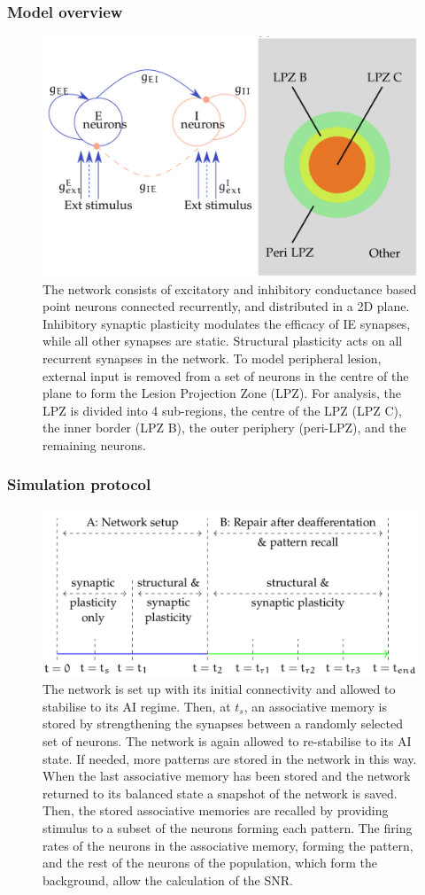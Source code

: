 \begin{frame}[c]
  \frametitle{Model overview}
  \begin{figure}[h]
    \centering
    \includegraphics[width=0.6\linewidth]{99_images/schematic}
    \caption{The network consists of excitatory and inhibitory conductance based point neurons connected recurrently, and distributed in a 2D plane. Inhibitory synaptic plasticity\footnotemark[2]{} modulates the efficacy of IE synapses, while all other synapses are static. Structural plasticity\footnotemark[3]{} acts on all recurrent synapses in the network. To model  peripheral lesion, external input is removed from a set of neurons in the centre of the plane to form the Lesion Projection Zone (LPZ). For analysis, the LPZ is divided into 4 sub-regions, the centre of the LPZ (LPZ C), the inner border (LPZ B), the outer periphery (peri-LPZ), and the remaining neurons.}
  \end{figure}%
\end{frame}
\begin{frame}[c]
  \frametitle{Simulation protocol}
  \begin{figure}[h]
    \centering
    \includegraphics[width=0.8\linewidth]{99_images/recall-protocol}
    \caption{The network is set up with its initial connectivity and allowed to stabilise to its AI regime. Then, at \(t_s\), an associative memory is stored by strengthening the synapses between a randomly selected set of neurons. The network is again allowed to re-stabilise to its AI state. If needed, more patterns are stored in the network in this way. When the last associative memory has been stored and the network returned to its balanced state a snapshot of the network is saved. Then, the stored associative memories are recalled by providing stimulus to a subset of the neurons forming each pattern. The firing rates of the neurons in the associative memory, forming the pattern, and the rest of the neurons of the population, which form the background, allow the calculation of the SNR\@.}%
  \end{figure}
\end{frame}

